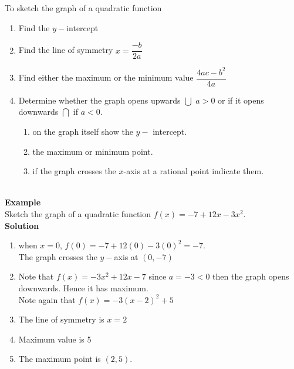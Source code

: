 \documentclass[11pt,a4paper]{article}
\begin{document}
\pagebreak
To sketch the graph of a quadratic function
\begin{enumerate}
\item Find the $y-$intercept
\item Find the line of symmetry \hspace{0.2cm}$x=\dfrac{-b}{2a}$
\item Find either the maximum or the minimum value \hspace{0.2cm}$\dfrac{4ac-b^2}{4a}$
\item Determine whether the graph opens upwards $\bigcup$ $a>0$ or if it opens downwards $\bigcap$ if $a<0$.
\begin{enumerate}
      \item on the graph itself show the $y-$ intercept.
      \item the maximum or minimum point.
      \item if the graph crosses the $x$-axis at a rational point indicate them.\\\\
\end{enumerate}
\end{enumerate}






\textbf{Example}\\
Sketch the graph of a quadratic function $f(x)=-7+12x-3x^2$.\\

\textbf{Solution}
\begin{enumerate}
\item when $x=0$, $f(0)=-7+12(0)-3(0)^2=-7$.\\
The graph crosses the $y-$axis at $(0,-7)$
\item Note that $f(x)=-3x^2+12x-7$ since $a=-3<0$ then the graph opens downwards. Hence it has maximum.\\
Note again that $f(x)=-3(x-2)^2+5$
\item The line of symmetry is $x=2$
\item Maximum value is 5
\item The maximum point is $(2,5)$.\\


\begin{figure}[H]
\centering
{}
\end{figure}

\end{enumerate}
\end{document}
